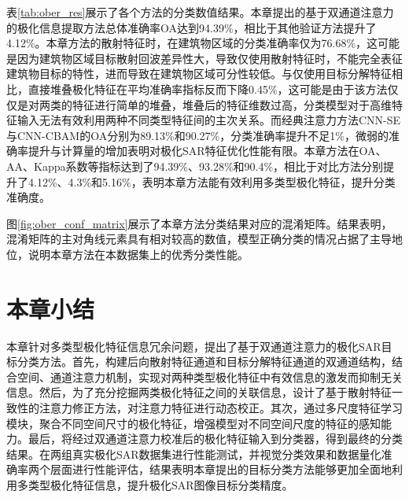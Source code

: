 表\ref{tab:ober_res}展示了各个方法的分类数值结果。本章提出的基于双通道注意力的极化信息提取方法总体准确率OA达到94.39\%，相比于其他验证方法提升了4.12\%。本章方法的散射特征时，在建筑物区域的分类准确率仅为76.68\%，这可能是因为建筑物区域目标散射回波差异性大，导致仅使用散射特征时，不能完全表征建筑物目标的特性，进而导致在建筑物区域可分性较低。与仅使用目标分解特征相比，直接堆叠极化特征在平均准确率指标反而下降0.45\%，这可能是由于该方法仅仅是对两类的特征进行简单的堆叠，堆叠后的特征维数过高，分类模型对于高维特征输入无法有效利用两种不同类型特征间的主次关系。而经典注意力方法CNN-SE与CNN-CBAM的OA分别为89.13\%和90.27\%，分类准确率提升不足1\%，微弱的准确率提升与计算量的增加表明对极化SAR特征优化性能有限。本章方法在OA、AA、Kappa系数等指标达到了94.39\%、93.28\%和90.4\%，相比于对比方法分别提升了4.12\%、4.3\%和5.16\%，表明本章方法能有效利用多类型极化特征，提升分类准确度。

图\ref{fig:ober_conf_matrix}展示了本章方法分类结果对应的混淆矩阵。结果表明，混淆矩阵的主对角线元素具有相对较高的数值，模型正确分类的情况占据了主导地位，说明本章方法在本数据集上的优秀分类性能。


\section{本章小结}
本章针对多类型极化特征信息冗余问题，提出了基于双通道注意力的极化SAR目标分类方法。首先，构建后向散射特征通道和目标分解特征通道的双通道结构，结合空间、通道注意力机制，实现对两种类型极化特征中有效信息的激发而抑制无关信息。然后，为了充分挖掘两类极化特征之间的关联信息，设计了基于散射特征一致性的注意力修正方法，对注意力特征进行动态校正。其次，通过多尺度特征学习模块，聚合不同空间尺寸的极化特征，增强模型对不同空间尺度的特征的感知能力。最后，将经过双通道注意力校准后的极化特征输入到分类器，得到最终的分类结果。在两组真实极化SAR数据集进行性能测试，并视觉分类效果和数据量化准确率两个层面进行性能评估，结果表明本章提出的目标分类方法能够更加全面地利用多类型极化特征信息，提升极化SAR图像目标分类精度。